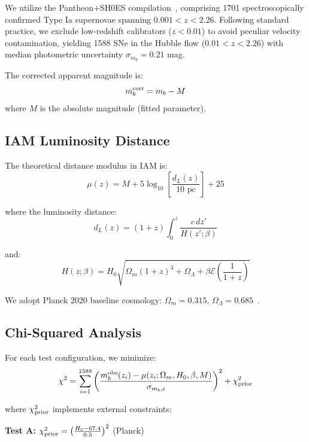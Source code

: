 \documentclass[twocolumn,superscriptaddress,prd,amsmath,amssymb]{revtex4-2}
\begin{document}
We utilize the Pantheon+SH0ES compilation~\cite{Brout2022}, comprising 1701 spectroscopically confirmed Type Ia supernovae spanning $0.001 < z < 2.26$. Following standard practice, we exclude low-redshift calibrators ($z < 0.01$) to avoid peculiar velocity contamination, yielding 1588 SNe in the Hubble flow ($0.01 < z < 2.26$) with median photometric uncertainty $\sigma_{m_b} = 0.21$ mag.

The corrected apparent magnitude is:
\begin{equation}
m_b^{\rm corr} = m_b - M
\end{equation}
where $M$ is the absolute magnitude (fitted parameter).

\subsection{IAM Luminosity Distance}

The theoretical distance modulus in IAM is:
\begin{equation}
\mu(z) = M + 5\log_{10}\left[\frac{d_L(z)}{10 \text{ pc}}\right] + 25
\end{equation}

where the luminosity distance:
\begin{equation}
d_L(z) = (1+z) \int_0^z \frac{c\,dz'}{H(z';\beta)}
\end{equation}

and:
\begin{equation}
H(z;\beta) = H_0\sqrt{\Omega_m(1+z)^3 + \Omega_\Lambda + \beta\mathcal{E}\left(\frac{1}{1+z}\right)}
\end{equation}

We adopt Planck 2020 baseline cosmology: $\Omega_m = 0.315$, $\Omega_\Lambda = 0.685$~\cite{PlanckCollaboration2020}.

\subsection{Chi-Squared Analysis}

For each test configuration, we minimize:
\begin{equation}
\chi^2 = \sum_{i=1}^{1588} \left(\frac{m_b^{\rm obs}(z_i) - \mu(z_i;\Omega_m,H_0,\beta,M)}{\sigma_{m_b,i}}\right)^2 + \chi^2_{\rm prior}
\label{eq:chi2}
\end{equation}

where $\chi^2_{\rm prior}$ implements external constraints:

\textbf{Test A:} $\chi^2_{\rm prior} = \left(\frac{H_0 - 67.4}{0.5}\right)^2$ (Planck)
\end{document}
